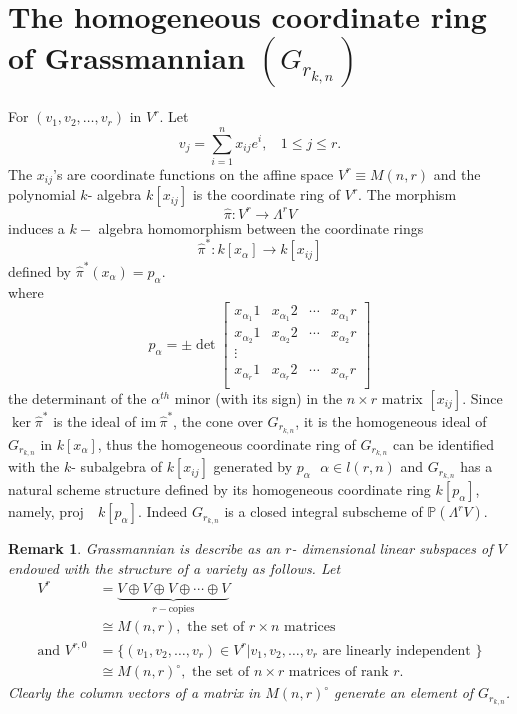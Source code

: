 \documentclass[12pt]{report}
\theoremstyle{theorem}
\newtheorem{remark}[theorem]{Remark}
\begin{document}
\section*{The homogeneous coordinate ring of Grassmannian $(G_{r_{k,n}})$}

For $(v_1,v_2,\ldots,v_r)$ in $V^r$. Let
$$
v_j = \sum_{i = 1}^n x_{ij}e^i,~~~~ 1\leq j\leq r.
$$
The $x_{ij}$'s are coordinate functions on the affine space $V^r\equiv M(n,r)$ and the polynomial $k$- algebra $k[x_{ij}]$ is the coordinate ring of $V^r$. The morphism
$$
\hat{\pi}: V^r\longrightarrow \Lambda^rV
$$
induces a $k-$ algebra homomorphism between the coordinate rings
$$\hat{\pi}^*: k[x_\alpha]\longrightarrow k[x_{ij}]$$
defined by $\hat{\pi}^*(x_\alpha) = p_{\alpha}$.\\
where
$$
p_{\alpha} = \pm\det
\begin{bmatrix}
x_{\alpha_1}1 & x_{\alpha_1}2 & \cdots & x_{\alpha_1}r\\
x_{\alpha_2}1 & x_{\alpha_2}2 & \cdots & x_{\alpha_2}r\\
\vdots\\
x_{\alpha_r}1 & x_{\alpha_r}2 & \cdots & x_{\alpha_r}r\\ 
\end{bmatrix}
$$ 
the determinant of the $\alpha^{th}$ minor (with its sign) in the $n\times r$ matrix $[x_{ij}]$. Since $\ker\hat{\pi}^*$ is the ideal of $\mbox{im}~\hat{\pi}^*$, the cone over $G_{r_{k,n}}$, it is the homogeneous ideal of $G_{r_{k,n}}$ in $k[x_\alpha]$, thus the homogeneous coordinate ring of $G_{r_{k,n}}$ can be identified with the $k$- subalgebra of $k[x_{ij}]$ generated by $p_\alpha ~~~\alpha\in  l(r,n)$ and $G_{r_{k,n}}$ has a natural scheme structure defined by its homogeneous coordinate ring $k[p_\alpha]$, namely, $\mbox{proj}\quad k[p_\alpha]$. Indeed $G_{r_{k,n}}$ is a closed integral subscheme of $\mathbb{P}(\Lambda^rV)$.
\begin{remark}
\normalfont Grassmannian is describe as an $r$- dimensional linear subspaces of $V$ endowed with the structure of a variety as follows. Let
\begin{align*}
V^r &= \underbrace{V\oplus V\oplus V\oplus \cdots\oplus V}_{r-\mbox{copies}}\\
&\cong M(n,r), \mbox{  the set of } r\times n \mbox{  matrices}\\
\mbox{and  } V^{r,0} &= \{(v_1,v_2,\ldots,v_r)\in V^r|v_1,v_2,\ldots,v_r \mbox{  are linearly independent  }\}\\
&\cong  M(n,r)^\circ, \mbox{  the set of  } n \times r \mbox{  matrices of rank  } r.
\end{align*}
Clearly the column vectors of a matrix in $M(n,r)^\circ$ generate an element of $G_{r_{k,n}}$.
\end{remark}
\end{document}
